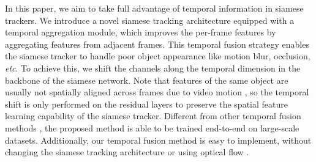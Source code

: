 In this paper, we aim to take full advantage of temporal information in siamese trackers.
We introduce a novel siamese tracking architecture equipped with a temporal aggregation module, which improves the per-frame features by aggregating features from adjacent frames.
This temporal fusion strategy enables the siamese tracker to handle poor object appearance like motion blur, occlusion, \textit{etc}.
To achieve this, we shift the channels along the temporal dimension \cite{lin2019tsm} in the backbone of the siamese network.
Note that features of the same object are usually not spatially aligned across frames due to video motion \cite{zhu2017flow}, so the temporal shift is only performed on the residual layers \cite{lin2019tsm} to preserve the spatial feature learning capability of the siamese tracker.
Different from other temporal fusion methods \cite{tao2016siamese, gladh2016deep}, the proposed method is able to be trained end-to-end on large-scale datasets.
Additionally, our temporal fusion method is easy to implement, without changing the siamese tracking architecture or using optical flow \cite{zhu2018end}.

